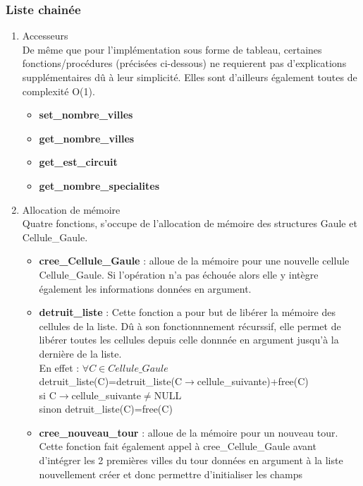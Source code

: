 \documentclass[a4paper, 11pt, oneside]{article}
\begin{document}
\subsubsection{Liste chainée}
\begin{enumerate}
    \item Accesseurs 
    \\De même que pour l'implémentation sous forme de tableau, certaines fonctions/procédures
    (précisées ci-dessous) ne requierent pas d'explications supplémentaires dû à leur simplicité. 
    Elles sont d'ailleurs également toutes de complexité O(1).
    \begin{itemize}
        \item \textbf{set\_nombre\_villes}
        \item \textbf{get\_nombre\_villes}
        \item \textbf{get\_est\_circuit}
        \item \textbf{get\_nombre\_specialites}
    \end{itemize}
    \item Allocation de mémoire
    \\Quatre fonctions, s'occupe de l'allocation de mémoire des structures Gaule et 
    \\Cellule\_Gaule. 
    \begin{itemize}
        \item \textbf{cree\_Cellule\_Gaule} : alloue de la mémoire pour une nouvelle cellule Cellule\_Gaule.
        Si l'opération n'a pas échouée alors elle y intègre également les informations données en argument.
        \item \textbf{detruit\_liste} : Cette fonction a pour but de libérer la mémoire des cellules 
        de la liste. Dû à son fonctionnnement récurssif, elle permet de libérer toutes les cellules depuis celle donnnée 
        en argument jusqu'à la dernière de la liste.
        \\En effet : $\forall C \in Cellule\_Gaule$
        \\detruit\_liste(C)=detruit\_liste(C$\rightarrow$cellule\_suivante)+free(C) 
        \\si C$\rightarrow$cellule\_suivante$\ne$NULL
        \\sinon detruit\_liste(C)=free(C)
        \item \textbf{cree\_nouveau\_tour} : alloue de la mémoire pour un nouveau tour. Cette fonction 
        fait également appel à cree\_Cellule\_Gaule avant d'intégrer les 2 premières villes du tour 
        données en argument à la liste nouvellement créer et donc permettre d'initialiser les champs 

\end{itemize}
\end{enumerate}
\end{document}
